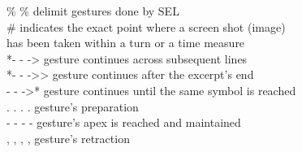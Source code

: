 \documentclass[output=paper]{langscibook}
\begin{document}
\begin{tabbing}
\% \%    \> delimit gestures done by SEL                         \\
\#       \>  indicates the exact point where a screen shot (image) \\
        \> has been taken within a turn or a time measure        \\
*- - ->    \> gesture continues across subsequent lines   \\
*- - ->>   \> gesture continues after the excerpt's end   \\
- - ->*    \> gesture continues until the same symbol is reached \\
. . . . \> gesture's preparation                       \\
- - - - \> gesture's apex is reached and maintained    \\
, , , ,  \> gesture's retraction
\end{tabbing}

{\sloppy\printbibliography[heading=subbibliography,notkeyword=this]}
\end{document}
